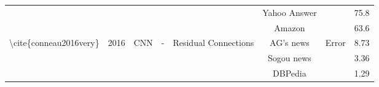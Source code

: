 \begin{table}[]
\begin{tabular}{|c|c|c|c|c|c|cc|}
                                                                                          &                                            &                                                   &                                                           &                                                                                                                        & Yahoo Answer                                          & \multicolumn{1}{c|}{}                                                                                                              & 75.8                       \\ \cline{6-6} \cline{8-8} 
                                                                                          &                                            &                                                   &                                                           &                                                                                                                        & Amazon                                                & \multicolumn{1}{c|}{}                                                                                                              & 63.6                       \\ \hline
    \multirow{6}{*}{\textbackslash{}cite\{conneau2016very\}}                              & \multirow{6}{*}{2016}                      & \multirow{6}{*}{CNN}                              & \multirow{6}{*}{-}                                        & \multirow{6}{*}{Residual Connections}                                                                                  & AG’s news                                             & \multicolumn{1}{c|}{\multirow{6}{*}{Error}}                                                                                        & 8.73                       \\ \cline{6-6} \cline{8-8} 
                                                                                          &                                            &                                                   &                                                           &                                                                                                                        & Sogou news                                            & \multicolumn{1}{c|}{}                                                                                                              & 3.36                       \\ \cline{6-6} \cline{8-8} 
                                                                                          &                                            &                                                   &                                                           &                                                                                                                        & DBPedia                                               & \multicolumn{1}{c|}{}                                                                                                              & 1.29                       \\ \cline{6-6} \cline{8-8} 

\end{tabular}
\end{table}
